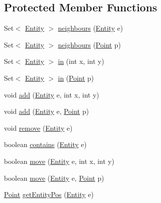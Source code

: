 \subsection*{Protected Member Functions}
\begin{DoxyCompactItemize}
\item 
Set$<$ \hyperlink{classjdungeon_1_1core_1_1world_1_1_entity}{Entity} $>$ \hyperlink{classjdungeon_1_1core_1_1world_1_1_board_a6baf039a7c209ae4b1bf4b3104e8fbd4}{neighbours} (\hyperlink{classjdungeon_1_1core_1_1world_1_1_entity}{Entity} e)
\item 
Set$<$ \hyperlink{classjdungeon_1_1core_1_1world_1_1_entity}{Entity} $>$ \hyperlink{classjdungeon_1_1core_1_1world_1_1_board_a3da2114366e2170fbc6b45a0a0e77aca}{neighbours} (\hyperlink{classjdungeon_1_1core_1_1world_1_1_point}{Point} p)
\item 
Set$<$ \hyperlink{classjdungeon_1_1core_1_1world_1_1_entity}{Entity} $>$ \hyperlink{classjdungeon_1_1core_1_1world_1_1_board_ada51771bcdc2668bcaf14ad7149f53d8}{in} (int x, int y)
\item 
Set$<$ \hyperlink{classjdungeon_1_1core_1_1world_1_1_entity}{Entity} $>$ \hyperlink{classjdungeon_1_1core_1_1world_1_1_board_a38badd8e6070d9708586e2e40f463463}{in} (\hyperlink{classjdungeon_1_1core_1_1world_1_1_point}{Point} p)
\item 
void \hyperlink{classjdungeon_1_1core_1_1world_1_1_board_a3c7285f8ba8208bcb5cd874a754eeb51}{add} (\hyperlink{classjdungeon_1_1core_1_1world_1_1_entity}{Entity} e, int x, int y)
\item 
void \hyperlink{classjdungeon_1_1core_1_1world_1_1_board_a3500589c14411be1da28d1e7ea03c6d8}{add} (\hyperlink{classjdungeon_1_1core_1_1world_1_1_entity}{Entity} e, \hyperlink{classjdungeon_1_1core_1_1world_1_1_point}{Point} p)
\item 
void \hyperlink{classjdungeon_1_1core_1_1world_1_1_board_a9bb5cb5443ae19cd9fc4218ae3c3f3a2}{remove} (\hyperlink{classjdungeon_1_1core_1_1world_1_1_entity}{Entity} e)
\item 
boolean \hyperlink{classjdungeon_1_1core_1_1world_1_1_board_acce5a16ab5087020bc437bcccb2d552e}{contains} (\hyperlink{classjdungeon_1_1core_1_1world_1_1_entity}{Entity} e)
\item 
boolean \hyperlink{classjdungeon_1_1core_1_1world_1_1_board_a72518eac07162d4c9431d5ebdeba3a3d}{move} (\hyperlink{classjdungeon_1_1core_1_1world_1_1_entity}{Entity} e, int x, int y)
\item 
boolean \hyperlink{classjdungeon_1_1core_1_1world_1_1_board_aafddcf0e8d8fd18c4cde1bd74b668cc7}{move} (\hyperlink{classjdungeon_1_1core_1_1world_1_1_entity}{Entity} e, \hyperlink{classjdungeon_1_1core_1_1world_1_1_point}{Point} p)
\item 
\hyperlink{classjdungeon_1_1core_1_1world_1_1_point}{Point} \hyperlink{classjdungeon_1_1core_1_1world_1_1_board_a7783936fc1c904771536a446875cf94b}{getEntityPos} (\hyperlink{classjdungeon_1_1core_1_1world_1_1_entity}{Entity} e)
\end{DoxyCompactItemize}



